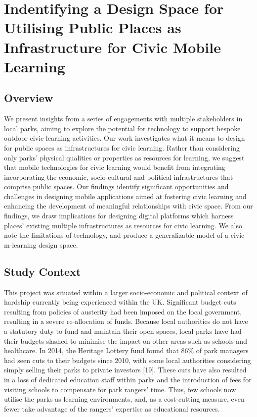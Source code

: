 \chapter{Indentifying a Design Space for Utilising Public Places as Infrastructure for Civic Mobile Learning}


\section{Overview}
We present insights from a series of engagements with multiple stakeholders in
local parks, aiming to explore the potential for technology to support bespoke
outdoor civic learning activities. Our work investigates what it means to design
for public spaces as infrastructures for civic learning. Rather than considering
only parks’ physical qualities or properties as resources for learning, we
suggest that mobile technologies for civic learning would benefit from
integrating incorporating the economic, socio-cultural and political
infrastructures that comprise public spaces.   Our findings identify significant
opportunities and challenges in designing mobile applications aimed at fostering
civic learning and enhancing the development of meaningful relationships with
civic space. From our findings, we draw implications for designing digital
platforms which harness places’ existing multiple infrastructures as resources
for civic learning. We also note the limitations of technology, and produce a
generalizable model of a civic m-learning design space.

\section{Study Context}

This project was situated within a larger socio-economic and political context of hardship currently being experienced within the UK. Significant budget cuts resulting from policies of austerity had been imposed on the local government, resulting in a severe re-allocation of funds. Because local authorities do not have a statutory duty to fund and maintain their open spaces, local parks have had their budgets slashed to minimise the impact on other areas such as schools and healthcare. In 2014, the Heritage Lottery fund found that 86\% of park managers had seen cuts to their budgets since 2010, with some local authorities considering simply selling their parks to private investors [19]. These cuts have also resulted in a loss of dedicated education staff within parks and the introduction of fees for visiting schools to compensate for park rangers’ time. Thus, few schools now utilise the parks as learning environments, and, as a cost-cutting measure, even fewer take advantage of the rangers’ expertise as educational resources.

